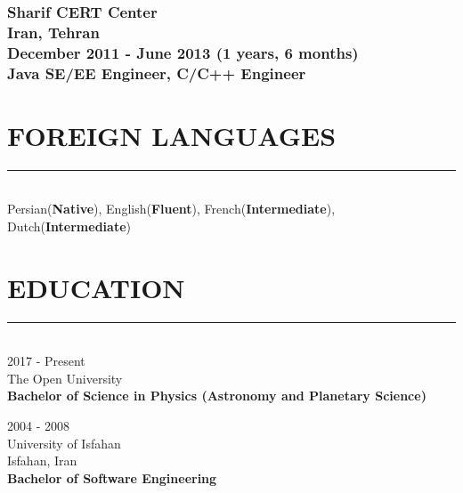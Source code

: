 \documentclass[10pt,a4paper]{article}
\begin{document}
\subsubsection{{ \textbullet \hspace{0.1cm} \large Sharif CERT Center} \\ 
\textnormal{Iran, Tehran} \\ 
\textnormal{December 2011 - June 2013 (1 years, 6 months)} \\ 
{Java SE/EE Engineer, C/C++ Engineer}}
\vspace{0.5cm}


\section{FOREIGN LANGUAGES}
\noindent \rule {18.0cm}{0.2pt} \\
    Persian(\textbf{Native}),
    English(\textbf{Fluent}),
    French(\textbf{Intermediate}),
    Dutch(\textbf{Intermediate})

\section{EDUCATION}
\noindent \rule {18.0cm}{0.2pt} \\
\textbullet \hspace{0.1cm} 2017 - Present \\
The Open University \\
\textbf{Bachelor of Science in Physics (Astronomy and Planetary Science)}
\vspace{0.3cm}

\noindent \textbullet \hspace{0.1cm}  2004 - 2008 \\
University of Isfahan \\
Isfahan, Iran \\
\textbf{Bachelor of Software Engineering}
\end{document}
